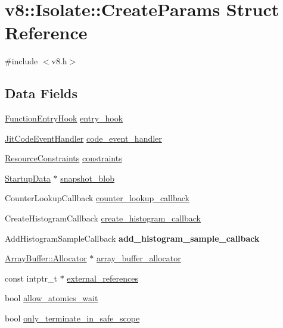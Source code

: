 \hypertarget{structv8_1_1Isolate_1_1CreateParams}{}\section{v8\+:\+:Isolate\+:\+:Create\+Params Struct Reference}
\label{structv8_1_1Isolate_1_1CreateParams}


{\ttfamily \#include $<$v8.\+h$>$}

\subsection*{Data Fields}
\begin{DoxyCompactItemize}
\item 
\mbox{\hyperlink{namespacev8_aaf07fb6bb13f295da3c6568938b7dec5}{Function\+Entry\+Hook}} \mbox{\hyperlink{structv8_1_1Isolate_1_1CreateParams_aa7aa18bbe2d86713e5b074a93b38dc60}{entry\+\_\+hook}}
\item 
\mbox{\hyperlink{namespacev8_a39243bc91e63d64d111452fdb98c4733}{Jit\+Code\+Event\+Handler}} \mbox{\hyperlink{structv8_1_1Isolate_1_1CreateParams_a783e3eba90ce6e2800bdd69197bbccdd}{code\+\_\+event\+\_\+handler}}
\item 
\mbox{\hyperlink{classv8_1_1ResourceConstraints}{Resource\+Constraints}} \mbox{\hyperlink{structv8_1_1Isolate_1_1CreateParams_a2c570b306aa8c1c24cfe70e8eee50fa1}{constraints}}
\item 
\mbox{\hyperlink{classv8_1_1StartupData}{Startup\+Data}} $\ast$ \mbox{\hyperlink{structv8_1_1Isolate_1_1CreateParams_a25d38476e4dec79ae96c59292eee4a64}{snapshot\+\_\+blob}}
\item 
Counter\+Lookup\+Callback \mbox{\hyperlink{structv8_1_1Isolate_1_1CreateParams_a10441abadd0b83a938303c92e7444fb6}{counter\+\_\+lookup\+\_\+callback}}
\item 
Create\+Histogram\+Callback \mbox{\hyperlink{structv8_1_1Isolate_1_1CreateParams_a11acf5fb9cdbc4c8bf15baf542507b49}{create\+\_\+histogram\+\_\+callback}}
\item 
\mbox{\label{structv8_1_1Isolate_1_1CreateParams_a3e0fb886996eb1f498b6cc157e11e280}} 
Add\+Histogram\+Sample\+Callback {\bfseries add\+\_\+histogram\+\_\+sample\+\_\+callback}
\item 
\mbox{\hyperlink{classv8_1_1ArrayBuffer_1_1Allocator}{Array\+Buffer\+::\+Allocator}} $\ast$ \mbox{\hyperlink{structv8_1_1Isolate_1_1CreateParams_a7c663f70b64290392eeaf164f57585f9}{array\+\_\+buffer\+\_\+allocator}}
\item 
const intptr\+\_\+t $\ast$ \mbox{\hyperlink{structv8_1_1Isolate_1_1CreateParams_a89b8c9dc74efbdcd93ab5786eae6fe19}{external\+\_\+references}}
\item 
bool \mbox{\hyperlink{structv8_1_1Isolate_1_1CreateParams_acade19de0f78ff15d76aaef2e292da72}{allow\+\_\+atomics\+\_\+wait}}
\item 
bool \mbox{\hyperlink{structv8_1_1Isolate_1_1CreateParams_af44a854a07944452589128b6cf3b9958}{only\+\_\+terminate\+\_\+in\+\_\+safe\+\_\+scope}}
\end{DoxyCompactItemize}


